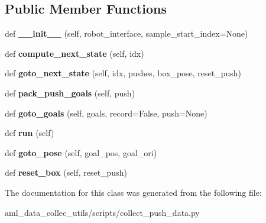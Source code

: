 \subsection*{Public Member Functions}
\begin{DoxyCompactItemize}
\item 
\hypertarget{classscripts_1_1collect__push__data_1_1_push_machine_ab52e5cdfd3fa0f44a42cc28b0e455805}{}\label{classscripts_1_1collect__push__data_1_1_push_machine_ab52e5cdfd3fa0f44a42cc28b0e455805} 
def {\bfseries \+\_\+\+\_\+init\+\_\+\+\_\+} (self, robot\+\_\+interface, sample\+\_\+start\+\_\+index=None)
\item 
\hypertarget{classscripts_1_1collect__push__data_1_1_push_machine_a0e61a816f035ae1e567e7045085c863e}{}\label{classscripts_1_1collect__push__data_1_1_push_machine_a0e61a816f035ae1e567e7045085c863e} 
def {\bfseries compute\+\_\+next\+\_\+state} (self, idx)
\item 
\hypertarget{classscripts_1_1collect__push__data_1_1_push_machine_ac4b7cb676dad43af1ef5ded0816b744e}{}\label{classscripts_1_1collect__push__data_1_1_push_machine_ac4b7cb676dad43af1ef5ded0816b744e} 
def {\bfseries goto\+\_\+next\+\_\+state} (self, idx, pushes, box\+\_\+pose, reset\+\_\+push)
\item 
\hypertarget{classscripts_1_1collect__push__data_1_1_push_machine_a3a7a1414cf2bad59da9f7f4233c996df}{}\label{classscripts_1_1collect__push__data_1_1_push_machine_a3a7a1414cf2bad59da9f7f4233c996df} 
def {\bfseries pack\+\_\+push\+\_\+goals} (self, push)
\item 
\hypertarget{classscripts_1_1collect__push__data_1_1_push_machine_ad5e7e2fafba07b8f7c66374544d1782c}{}\label{classscripts_1_1collect__push__data_1_1_push_machine_ad5e7e2fafba07b8f7c66374544d1782c} 
def {\bfseries goto\+\_\+goals} (self, goals, record=False, push=None)
\item 
\hypertarget{classscripts_1_1collect__push__data_1_1_push_machine_a88989da4bca9d3fbd405e78d046cbe5a}{}\label{classscripts_1_1collect__push__data_1_1_push_machine_a88989da4bca9d3fbd405e78d046cbe5a} 
def {\bfseries run} (self)
\item 
\hypertarget{classscripts_1_1collect__push__data_1_1_push_machine_a205d06b99c1e1a3f98a0af0a92b3fd80}{}\label{classscripts_1_1collect__push__data_1_1_push_machine_a205d06b99c1e1a3f98a0af0a92b3fd80} 
def {\bfseries goto\+\_\+pose} (self, goal\+\_\+pos, goal\+\_\+ori)
\item 
\hypertarget{classscripts_1_1collect__push__data_1_1_push_machine_aa502c6b6bdb49d214e75e7102b23afcd}{}\label{classscripts_1_1collect__push__data_1_1_push_machine_aa502c6b6bdb49d214e75e7102b23afcd} 
def {\bfseries reset\+\_\+box} (self, reset\+\_\+push)
\end{DoxyCompactItemize}


The documentation for this class was generated from the following file\+:\begin{DoxyCompactItemize}
\item 
aml\+\_\+data\+\_\+collec\+\_\+utils/scripts/collect\+\_\+push\+\_\+data.\+py\end{DoxyCompactItemize}

